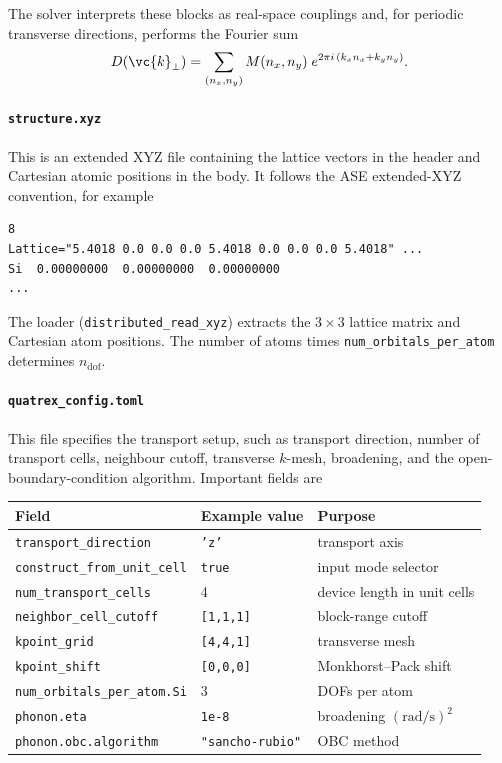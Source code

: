 The solver interprets these blocks as real-space couplings and, for
periodic transverse directions, performs the Fourier sum
\begin{equation}
  D(\vc{k}_\perp)
  = \sum_{(n_x,n_y)} M(n_x,n_y)\;
    e^{2\pi i\,(k_x n_x + k_y n_y)}.
\end{equation}

\paragraph{\texttt{structure.xyz}}
This is an extended XYZ file containing the lattice vectors in the
header and Cartesian atomic positions in the body.  It follows the ASE
extended-XYZ convention, for example
\begin{verbatim}
8
Lattice="5.4018 0.0 0.0 0.0 5.4018 0.0 0.0 0.0 5.4018" ...
Si  0.00000000  0.00000000  0.00000000
...
\end{verbatim}
The loader (\texttt{distributed\_read\_xyz}) extracts the $3\times3$
lattice matrix and Cartesian atom positions.  The number of atoms times
\texttt{num\_orbitals\_per\_atom} determines $n_\mathrm{dof}$.

\paragraph{\texttt{quatrex\_config.toml}}
This file specifies the transport setup, such as transport direction,
number of transport cells, neighbour cutoff, transverse $k$-mesh,
broadening, and the open-boundary-condition algorithm.  Important fields are
\begin{center}
\begin{tabular}{lll}
  \toprule
  Field & Example value & Purpose \\
  \midrule
  \texttt{transport\_direction}       & \texttt{'z'}            & transport axis \\
  \texttt{construct\_from\_unit\_cell}& \texttt{true}           & input mode selector \\
  \texttt{num\_transport\_cells}      & 4                       & device length in unit cells \\
  \texttt{neighbor\_cell\_cutoff}     & \texttt{[1,1,1]}        & block-range cutoff \\
  \texttt{kpoint\_grid}               & \texttt{[4,4,1]}        & transverse mesh \\
  \texttt{kpoint\_shift}              & \texttt{[0,0,0]}        & Monkhorst--Pack shift \\
  \texttt{num\_orbitals\_per\_atom.Si}& 3                       & DOFs per atom \\
  \texttt{phonon.eta}                 & \texttt{1e-8}           & broadening $(\mathrm{rad/s})^2$ \\
  \texttt{phonon.obc.algorithm}       & \texttt{"sancho-rubio"} & OBC method \\
  \bottomrule
\end{tabular}
\end{center}

